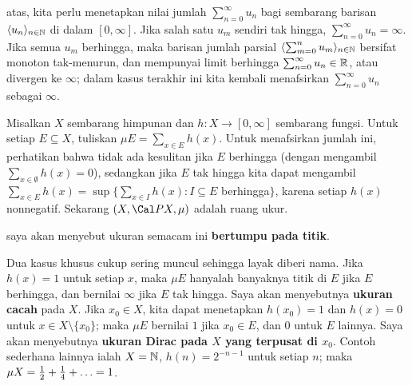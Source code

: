 atas, kita perlu menetapkan nilai jumlah $\sum_{n=0}^{\infty}u_n$ bagi
sembarang barisan $\langle u_n\rangle_{n\in\Bbb N}$ di dalam
$[0,\infty]$.  %
Jika salah satu $u_m$ sendiri tak hingga,  $\sum_{n=0}^{\infty}u_n=\infty$. Jika semua $u_m$
berhingga, maka barisan jumlah
parsial $\langle\sum_{m=0}^nu_m\rangle_{n\in\Bbb N}$ bersifat monoton
tak-menurun, dan mempunyai limit berhingga
$\sum_{n=0}^{\infty}u_n\in\Bbb R$, atau divergen ke $\infty$; dalam
kasus terakhir ini kita kembali menafsirkan
$\sum_{n=0}^{\infty}u_n$ sebagai $\infty$.

 Misalkan $X$ sembarang himpunan dan
$h:X\to[0,\infty]$ sembarang fungsi. Untuk setiap $E\subseteq X$,
tuliskan $\mu E=\sum_{x\in E}h(x)$. Untuk menafsirkan jumlah ini,
perhatikan bahwa tidak ada kesulitan jika $E$ berhingga (dengan
mengambil $\sum_{x\in\emptyset}h(x)=0$), sedangkan jika $E$ tak hingga
kita dapat mengambil
$\sum_{x\in E}h(x)=\sup\{\sum_{x\in I}h(x):I\subseteq E$ berhingga$\}$,
karena setiap $h(x)$ nonnegatif. 
Sekarang $(X,\Cal PX,\mu)$ adalah ruang ukur.

 saya akan menyebut ukuran semacam ini {\bf bertumpu pada
titik}.

Dua kasus khusus cukup sering muncul sehingga layak diberi nama. Jika
$h(x)=1$ untuk setiap $x$, maka $\mu E$ hanyalah banyaknya titik di
$E$ jika $E$ berhingga, dan bernilai $\infty$ jika $E$ tak hingga.
Saya akan menyebutnya {\bf ukuran cacah} pada $X$. Jika $x_0\in X$,
kita dapat menetapkan $h(x_0)=1$ dan $h(x)=0$ untuk
$x\in X\setminus\{x_0\}$; maka $\mu E$ bernilai $1$ jika $x_0\in E$,
dan $0$ untuk $E$ lainnya. Saya akan menyebutnya {\bf ukuran Dirac pada
$X$ yang terpusat di $x_0$}. Contoh sederhana lainnya ialah
$X=\Bbb N$, $h(n)=2^{-n-1}$ untuk setiap $n$; maka
$\mu X={1\over 2}+{1\over 4}+\ldots=1$.


